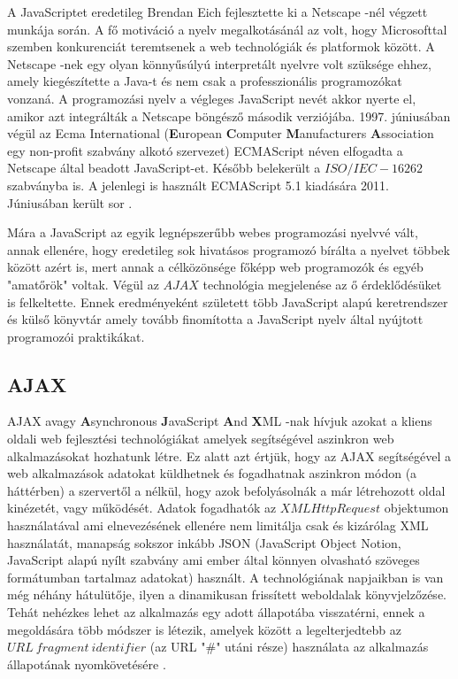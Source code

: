 \documentclass[12pt]{report}
\theoremstyle{definition}
\begin{document}
	A JavaScriptet eredetileg Brendan Eich fejlesztette ki a Netscape -nél végzett munkája során. A fő motiváció a nyelv megalkotásánál az volt, hogy Microsofttal szemben konkurenciát teremtsenek a web technológiák és platformok között. A Netscape -nek egy olyan könnyűsúlyú interpretált nyelvre volt szüksége ehhez, amely kiegészítette a Java-t és nem csak a professzionális programozókat vonzaná. A programozási nyelv a végleges JavaScript nevét akkor nyerte el, amikor azt integrálták a Netscape böngésző második verziójába. 1997. júniusában végül az Ecma International (\textbf{E}uropean \textbf{C}omputer \textbf{M}anufacturers \textbf{A}ssociation egy non-profit szabvány alkotó szervezet) ECMAScript néven elfogadta a Netscape által beadott JavaScript-et. Később belekerült a $ISO/IEC-16262$ szabványba is. A jelenlegi is használt ECMAScript 5.1 kiadására 2011. Júniusában került sor \cite{ECMAScript 5.1 release}.
	
	Mára a JavaScript az egyik legnépszerűbb webes programozási nyelvvé vált, annak ellenére, hogy eredetileg sok hivatásos programozó bírálta a nyelvet többek között azért is, mert annak a célközönsége főképp web programozók és egyéb "amatőrök" voltak. Végül az $AJAX$ technológia megjelenése az ő érdeklődésüket is felkeltette. Ennek eredményeként született több JavaScript alapú keretrendszer és külső könyvtár amely tovább finomította a JavaScript nyelv által nyújtott programozói praktikákat. 
	
	\subsection{AJAX}
	
	AJAX avagy \textbf{A}synchronous \textbf{J}avaScript \textbf{A}nd \textbf{X}ML -nak hívjuk azokat a kliens oldali web fejlesztési technológiákat amelyek segítségével aszinkron web alkalmazásokat hozhatunk létre. Ez alatt azt értjük, hogy az AJAX segítségével a web alkalmazások adatokat küldhetnek és fogadhatnak aszinkron módon (a háttérben) a szervertől a nélkül, hogy azok befolyásolnák a már létrehozott oldal kinézetét, vagy működését. Adatok fogadhatók az $XMLHttpRequest$ objektumon használatával ami elnevezésének ellenére nem limitálja csak és kizárólag XML használatát, manapság sokszor inkább JSON (JavaScript Object Notion, JavaScript alapú nyílt szabvány ami ember által könnyen olvasható szöveges formátumban tartalmaz adatokat) használt. A technológiának napjaikban is van még néhány hátulütője, ilyen a dinamikusan frissített weboldalak könyvjelzőzése. Tehát nehézkes lehet az alkalmazás egy adott állapotába visszatérni, ennek a megoldására több módszer is létezik, amelyek között a legelterjedtebb az $URL\ fragment\ identifier$ (az URL "\#" utáni része) használata az alkalmazás állapotának nyomkövetésére \cite{deep linking for ajax}. 
	
\end{document}
